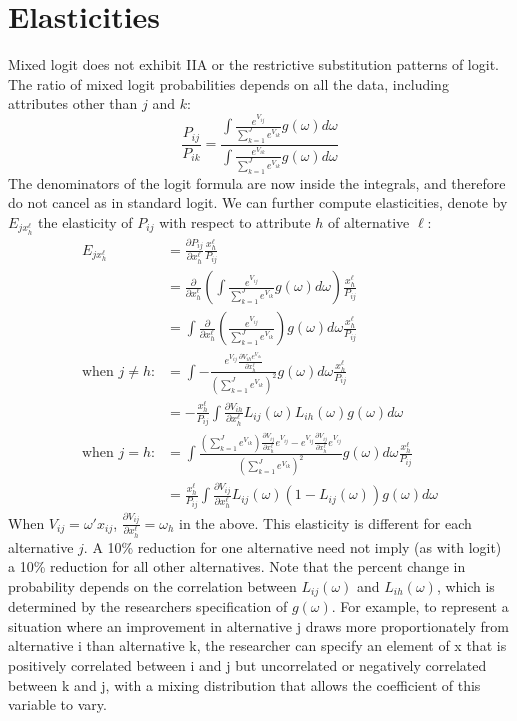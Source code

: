 \documentclass[DIV=14,titlepage=false]{scrreprt}
\begin{document}
\section{Elasticities}
Mixed logit does not exhibit IIA or the restrictive substitution patterns of logit. The ratio of mixed logit probabilities depends on all the data, including attributes other than $j$ and $k$:
\[
\frac{P_{ij}}{P_{ik}} = \frac{\int \frac{e^{V_{ij}}}{\sum_{k=1}^{J}e^{V_{ik}}}g(\omega)d\omega}{\int \frac{e^{V_{ik}}}{\sum_{k=1}^{J}e^{V_{ik}}}g(\omega)d\omega}
\]
The denominators of the logit formula are now inside the integrals, and therefore do not cancel as in standard logit. We can further compute elasticities, denote by $E_{jx_h^\ell}$ the elasticity of $P_{ij}$ with respect to attribute $h$ of alternative $\ell$:
\begin{align*}
    E_{jx_h^\ell} &= \frac{\partial P_{ij}}{\partial x_h^\ell}\frac{x_h^\ell}{P_{ij}}\\
    &= \frac{\partial}{\partial x_h^\ell}\left(\int \frac{e^{V_{ij}}}{\sum_{k=1}^{J}e^{V_{ik}}}g(\omega)d\omega\right)\frac{x_h^\ell}{P_{ij}}\\
    &= \int \frac{\partial}{\partial x_h^\ell}\left(\frac{e^{V_{ij}}}{\sum_{k=1}^{J}e^{V_{ik}}}\right)g(\omega)d\omega\frac{x_h^\ell}{P_{ij}} \\
    \text{when $j \not = h$:}&= \int - \frac{e^{V_{ij}}\frac{\partial V_{ih}e^{V_{ih}}}{\partial x_h^\ell}}{\left(\sum_{k=1}^{J}e^{V_{ik}}\right)^2}g(\omega)d\omega\frac{x_h^\ell}{P_{ij}}\\
    &= - \frac{x_h^\ell}{P_{ij}}\int \frac{\partial V_{ih}}{\partial x_h^\ell}L_{ij}(\omega)L_{ih}(\omega)g(\omega)d\omega\\
    \text{when $j = h$:}&= \int \frac{\left(\sum_{k=1}^{J}e^{V_{ik}}\right)\frac{\partial V_{ij}}{\partial x_h^\ell} e^{V_{ij}} - e^{V_{ij}}\frac{\partial V_{ij}}{\partial x_h^\ell}e^{V_{ij}}}{\left(\sum_{k=1}^{J}e^{V_{ik}}\right)^2}g(\omega)d\omega\frac{x_h^\ell}{P_{ij}}\\
    &= \frac{x_h^\ell}{P_{ij}}\int \frac{\partial V_{ij}}{\partial x_h^\ell}L_{ij}(\omega)(1-L_{ij}(\omega))g(\omega)d\omega
\end{align*}
When $V_{ij} = \omega'x_{ij}$, $\frac{\partial V_{ij}}{\partial x_h^\ell} = \omega_h$ in the above. This elasticity is different for each alternative $j$. A 10\% reduction for one alternative need not imply (as with logit) a 10\% reduction for all other alternatives. Note that the percent change in probability depends on the correlation between $L_{ij}(\omega)$ and $L_{ih}(\omega)$, which is determined by the researchers specification of $g(\omega)$. For example, to represent a situation where an improvement in alternative j draws more proportionately from alternative i than alternative k, the researcher can specify an element of x that is positively correlated between i and j but uncorrelated or negatively correlated between k and j, with a mixing distribution that allows the coefficient of this variable to vary.
\end{document}
